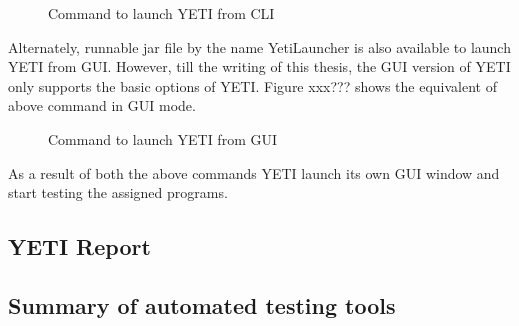 {\begin{figure}[h]
	\centering
	\caption{Command to launch YETI from CLI}
\end{figure}

Alternately, runnable jar file by the name YetiLauncher is also available to launch YETI from GUI. However, till the writing of this thesis, the GUI version of YETI only supports the basic options of YETI. Figure xxx??? shows the equivalent of above command in GUI mode.

\begin{figure}[h]
	\centering
	\caption{Command to launch YETI from GUI}
\end{figure}


As a result of both the above commands YETI launch its own GUI window and start testing the assigned programs. 




\subsection{YETI Report}



\subsection{Summary of automated testing tools}


}
